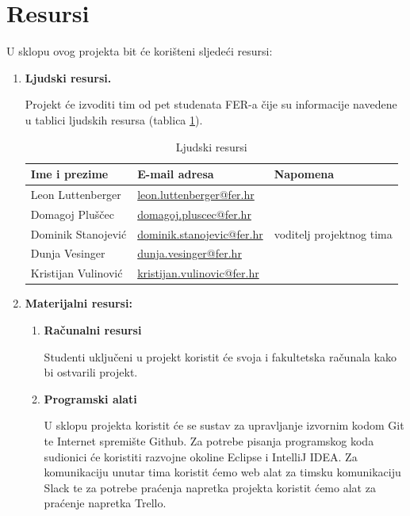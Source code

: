 \documentclass[times, utf8, numeric]{fer}
\begin{document}
\section{Resursi}
U sklopu ovog projekta bit će korišteni sljedeći resursi:
\begin{enumerate}
	\item \begin{flushleft}\textbf{Ljudski resursi.}\end{flushleft}
	Projekt će izvoditi tim od pet studenata FER-a čije su informacije navedene u tablici ljudskih resursa (tablica 			\ref{table:ljudstvo}).
	
	\begin{table}[H]
	\centering
 	\begin{tabular}{|l l l|} 
 	\hline
 	Ime i prezime & E-mail adresa & Napomena\\ [0.5ex] 
	\hline
 	Leon Luttenberger & \href{mailto:leon.luttenberger@fer.hr}{leon.luttenberger@fer.hr} & \\
 	Domagoj Pluščec & \href{mailto:domagoj.pluscec@fer.hr}{domagoj.pluscec@fer.hr} & \\
 	Dominik Stanojević & \href{mailto:dominik.stanojevic@fer.hr}{dominik.stanojevic@fer.hr} & 
 	voditelj projektnog tima\\
 	Dunja Vesinger & \href{mailto:dunja.vesinger@fer.hr}{dunja.vesinger@fer.hr} & \\
 	Kristijan Vulinović & \href{mailto:kristijan.vulinovic@fer.hr}{kristijan.vulinovic@fer.hr} & \\
 	\hline
 	\end{tabular}
 	\caption{Ljudski resursi}
	\label{table:ljudstvo}
	\end{table}
	
	\item \begin{flushleft}\textbf{ Materijalni resursi:} \end{flushleft}
	\begin{enumerate}
		\item \begin{flushleft}\textbf{Računalni resursi}\end{flushleft}
		Studenti uključeni u projekt koristit će svoja i fakultetska računala kako bi ostvarili projekt.
		
		\item \begin{flushleft}\textbf{Programski alati}\end{flushleft}
		U sklopu projekta koristit će se sustav za upravljanje izvornim kodom Git te Internet spremište 				Github. Za potrebe pisanja programskog koda sudionici će koristiti razvojne okoline Eclipse i IntelliJ IDEA. Za komunikaciju unutar tima koristit ćemo web alat za timsku komunikaciju Slack te za potrebe 	praćenja napretka projekta koristit ćemo alat za praćenje napretka Trello.
\end{enumerate}
\end{enumerate}
\end{document}
